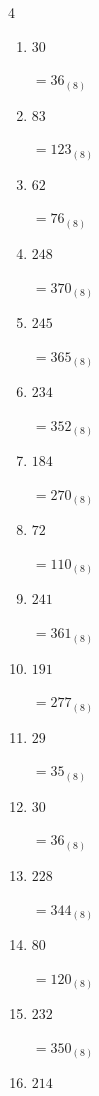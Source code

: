 \begin{multicols}{4}
\begin{enumerate}
        $=122_{(8)}$

  \item $30$

        $=36_{(8)}$

  \item $83$

        $=123_{(8)}$

\columnbreak %

\resetques

  \item $62$

        $=76_{(8)}$

  \item $248$

        $=370_{(8)}$

  \item $245$

        $=365_{(8)}$

  \item $234$

        $=352_{(8)}$

  \item $184$

        $=270_{(8)}$

  \item $72$

        $=110_{(8)}$

  \item $241$

        $=361_{(8)}$

  \item $191$

        $=277_{(8)}$

  \item $29$

        $=35_{(8)}$

  \item $30$

        $=36_{(8)}$

  \item $228$

        $=344_{(8)}$

  \item $80$

        $=120_{(8)}$

  \item $232$

        $=350_{(8)}$

  \item $214$


\end{enumerate}
\end{multicols}

